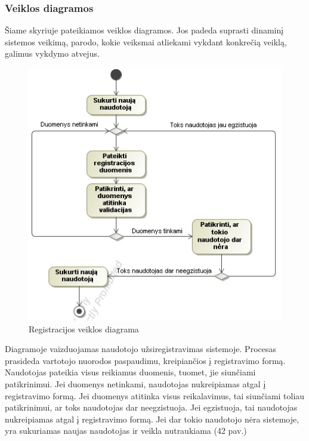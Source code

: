\documentclass{VUMIFPSkursinis}
\begin{document}
\subsubsection{Veiklos diagramos}
Šiame skyriuje pateikiamos veiklos diagramos. Jos padeda suprasti dinaminį sistemos veikimą, parodo, kokie veiksmai atliekami vykdant konkrečią veiklą, galimus vykdymo atvejus.
\begin{figure}[H]
\centering
\includegraphics[scale=1, frame]{img/veiklos(registracija).png}
\caption{Registracijos veiklos diagrama}
\end{figure}
Diagramoje vaizduojamas naudotojo užsiregistravimas sistemoje. Procesas prasideda vartotojo nuorodos paspaudimu, kreipiančios į registravimo formą. Naudotojas pateikia visus reikiamus duomenis, tuomet, jie siunčiami patikrinimui. Jei duomenys netinkami, naudotojas nukreipiamas atgal į registravimo formą. Jei duomenys atitinka visus reikalavimus, tai siunčiami toliau patikrinimui, ar toks naudotojas dar neegzistuoja. Jei egzistuoja, tai naudotojas nukreipiamas atgal į registravimo formą. Jei dar tokio naudotojo nėra sistemoje, yra sukuriamas naujas naudotojas ir veikla nutraukiama (42 pav.)
\end{document}
